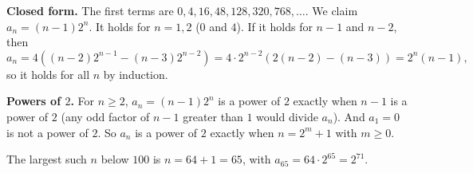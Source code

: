 \textbf{Closed form.} The first terms are $0,4,16,48,128,320,768,\dots$. We claim $a_n=(n-1)2^n$. It holds for $n=1,2$ ($0$ and $4$). If it holds for $n-1$ and $n-2$, then
\[
a_n=4\left((n-2)2^{n-1}-(n-3)2^{n-2}\right)=4\cdot2^{n-2}\left(2(n-2)-(n-3)\right)=2^n(n-1),
\]
so it holds for all $n$ by induction.

\textbf{Powers of $2$.} For $n\ge2$, $a_n=(n-1)2^n$ is a power of $2$ exactly when $n-1$ is a power of $2$ (any odd factor of $n-1$ greater than $1$ would divide $a_n$). And $a_1=0$ is not a power of $2$. So $a_n$ is a power of $2$ exactly when $n=2^m+1$ with $m\ge0$.

The largest such $n$ below $100$ is $n=64+1=\boxed{65}$, with $a_{65}=64\cdot2^{65}=2^{71}$.
